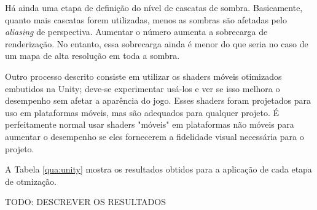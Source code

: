 Há ainda uma etapa de definição do nível de cascatas de sombra. Basicamente, quanto mais cascatas forem utilizadas, menos as sombras são afetadas pelo \textit{aliasing} de perspectiva. Aumentar o número aumenta a sobrecarga de renderização. No entanto, essa sobrecarga ainda é menor do que seria no caso de um mapa de alta resolução em toda a sombra.

Outro processo descrito consiste em utilizar os shaders móveis otimizados embutidos na Unity; deve-se experimentar usá-los e ver se isso melhora o desempenho sem afetar a aparência do jogo. Esses shaders foram projetados para uso em plataformas móveis, mas são adequados para qualquer projeto. É perfeitamente normal usar shaders "móveis" em plataformas não móveis para aumentar o desempenho se eles fornecerem a fidelidade visual necessária para o projeto.

A Tabela \ref{qua:unity} mostra os resultados obtidos para a aplicação de cada etapa de otmização.



TODO: DESCREVER OS RESULTADOS
